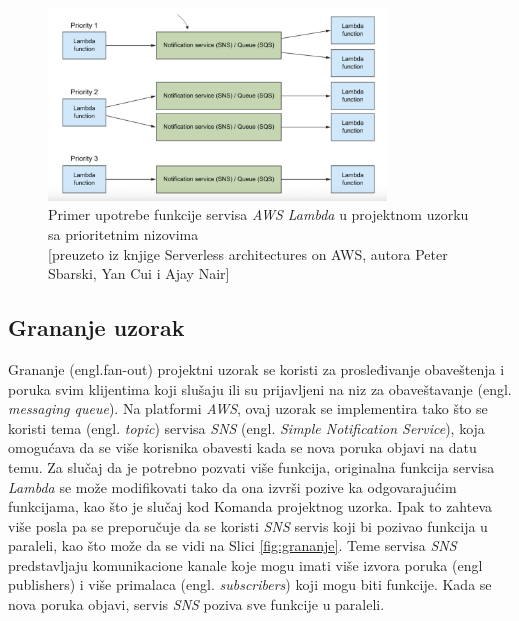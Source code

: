 \documentclass[12pt,oneside]{memoir}
\begin{document}
\begin{figure}[!ht]
  \centering
  \includegraphics[width=0.8\textwidth]{Slika 14.png}
  \caption{Primer upotrebe funkcije servisa \emph{AWS Lambda} u projektnom uzorku sa prioritetnim nizovima\\\footnotesize[preuzeto iz knjige Serverless architectures on AWS, autora Peter Sbarski, Yan Cui i Ajay Nair]}
  \label{fig:nizovi}
\end{figure}

\subsection{Grananje uzorak} %
Grananje (engl.fan-out) projektni uzorak se koristi za prosleđivanje obaveštenja i poruka svim klijentima koji slušaju ili su prijavljeni na niz za obaveštavanje (engl. \emph{messaging queue}). Na platformi \emph{AWS}, ovaj uzorak se implementira tako što se koristi tema (engl. \emph{topic}) servisa \emph{SNS} (engl. \emph{Simple Notification Service}), koja omogućava da se više korisnika obavesti kada se nova poruka objavi na datu temu. Za slučaj da je potrebno pozvati više funkcija, originalna funkcija servisa \emph{Lambda} se može modifikovati tako da ona izvrši pozive ka odgovarajućim funkcijama, kao što je slučaj kod Komanda projektnog uzorka. Ipak to zahteva više posla pa se preporučuje da se koristi \emph{SNS} servis koji bi pozivao funkcija u paraleli, kao što može da se vidi na Slici \ref{fig:grananje}. Teme servisa \emph{SNS} predstavljaju komunikacione kanale koje mogu imati više izvora poruka (engl publishers) i više primalaca (engl. \emph{subscribers}) koji mogu biti funkcije. Kada se nova poruka objavi, servis \emph{SNS} poziva sve funkcije u paraleli.
\end{document}
